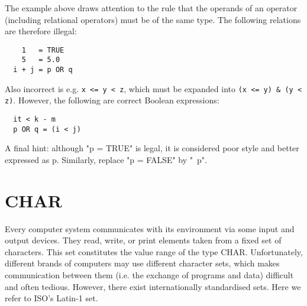 The example above draws attention to the rule that the operands of an operator (including relational
operators) must be of the same type. The following relations are therefore illegal:
\begin{verbatim}
    1   = TRUE
    5   = 5.0
  i + j = p OR q
\end{verbatim}
Also incorrect is e.g. \verb|x <= y < z|, which must be expanded into \verb|(x <= y) & (y < z)|.
However, the following are correct Boolean expressions:
\begin{verbatim}
  it < k - m
  p OR q = (i < j)
\end{verbatim}
A final hint: although "p = TRUE" is legal, it is considered poor style and better expressed as p.
Similarly, replace "p = FALSE" by "~p".

\section{CHAR}
Every computer system communicates with its environment via some input and output devices.
They read, write, or print elements taken from a fixed set of characters. This set constitutes the
value range of the type CHAR. Unfortunately, different brands of computers may use different
character sets, which makes communication between them (i.e. the exchange of programs and
data) difficult and often tedious. However, there exist internationally standardised sets. Here we
refer to ISO’s Latin-1 set.


